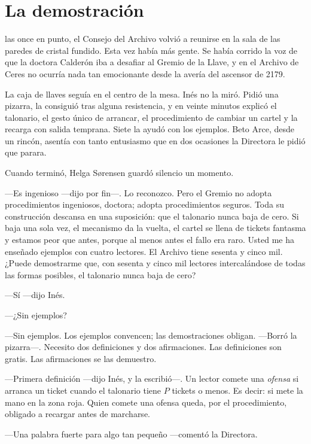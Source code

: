 \chapter{La demostración}

 las once en punto, el Consejo del Archivo volvió a reunirse en la sala de las paredes de cristal fundido. Esta vez había más gente. Se había corrido la voz de que la doctora Calderón iba a desafiar al Gremio de la Llave, y en el Archivo de Ceres no ocurría nada tan emocionante desde la avería del ascensor de 2179.

La caja de llaves seguía en el centro de la mesa. Inés no la miró. Pidió una pizarra, la consiguió tras alguna resistencia, y en veinte minutos explicó el talonario, el gesto único de arrancar, el procedimiento de cambiar un cartel y la recarga con salida temprana. Siete la ayudó con los ejemplos. Beto Arce, desde un rincón, asentía con tanto entusiasmo que en dos ocasiones la Directora le pidió que parara.

Cuando terminó, Helga Sørensen guardó silencio un momento.

---Es ingenioso ---dijo por fin---\nobreak. Lo reconozco. Pero el Gremio no adopta procedimientos ingeniosos, doctora; adopta procedimientos seguros. Toda su construcción descansa en una suposición: que el talonario nunca baja de cero. Si baja una sola vez, el mecanismo da la vuelta, el cartel se llena de tickets fantasma y estamos peor que antes, porque al menos antes el fallo era raro. Usted me ha enseñado ejemplos con cuatro lectores. El Archivo tiene sesenta y cinco mil. ¿Puede demostrarme que, con sesenta y cinco mil lectores intercalándose de todas las formas posibles, el talonario nunca baja de cero?

---Sí ---dijo Inés.

---¿Sin ejemplos?

---Sin ejemplos. Los ejemplos convencen; las demostraciones obligan. ---Borró la pizarra---\nobreak. Necesito dos definiciones y dos afirmaciones. Las definiciones son gratis. Las afirmaciones se las demuestro.

\escena
---Primera definición ---dijo Inés, y la escribió---\nobreak. Un lector comete una \emph{ofensa} si arranca un ticket cuando el talonario tiene $P$ tickets o menos. Es decir: si mete la mano en la zona roja. Quien comete una ofensa queda, por el procedimiento, obligado a recargar antes de marcharse.

---Una palabra fuerte para algo tan pequeño ---comentó la Directora.

